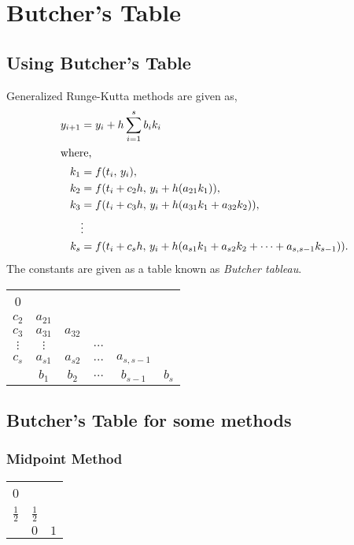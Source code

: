 \documentclass[../main-sheet.tex]{subfiles}
\begin{document}
\chapter{Butcher's Table}\label{butch}
\section{Using Butcher's Table}
Generalized Runge-Kutta methods are given as,
\begin{align*}
    y_{i+1}&=y_i+h\sum_{i=1}^s b_ik_i\\
    \intertext{where,}
    k_{1}&=f(t_i,\, y_i),\\
    k_{2}&=f(t_i+c_2h,\, y_i+h(a_{21}k_1)),\\
    k_{3}&=f(t_i+c_3h,\, y_i+h(a_{31}k_1+a_{32}k_2)),\\
    &\vdots\\
    k_{s}&=f(t_i+c_sh,\, y_i+h(a_{s1}k_1+a_{s2}k_2+\dots+a_{s,s-1}k_{s-1})).
\end{align*}
The constants are given as a table known as \emph{Butcher tableau}.
\begin{table}[H]
    \centering
    \begin{tabular}{c|ccccc}
        0 & & & & & \\
        \(c_2\) & \(a_{21}\) & & & & \\
        \(c_3\) & \(a_{31}\) & \(a_{32}\) & & & \\
        \(\vdots\) & \(\vdots\) &  & \(\ldots\) & & \\
        \(c_s\) & \(a_{s1}\) & \(a_{s2}\) & \(\dots\) & \(a_{s,s-1}\) & \\[0.35 em]
        \hline
         & \(b_{1}\) & \(b_{2}\) & \(\dots\) & \(b_{s-1}\) & \(b_{s}\)\Tstrut \\
    \end{tabular}
\end{table}
\section{Butcher's Table for some methods}
\subsection{Midpoint Method}
\begin{table}[H]
    \centering
    \begin{tabular}{c|cc}
        0 & & \\[.5 em]
        \(\frac{1}{2}\) & \(\frac{1}{2}\) & \\[0.5em]
        \hline
        \Tstrut & \(0\) & \(1\) \\
    \end{tabular}
\end{table}
\end{document}
